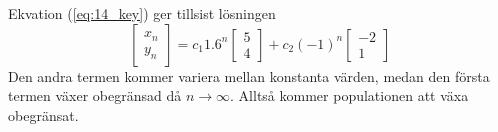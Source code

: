 \documentclass[a4paper]{article}
\begin{document}
Ekvation (\ref{eq:14_key}) ger tillsist lösningen
\begin{equation*}
\begin{bmatrix}x_n\\y_n\end{bmatrix} =c_1 1.6^n\begin{bmatrix}5\\4\end{bmatrix} + c_2(-1)^n\begin{bmatrix}-2\\1\end{bmatrix}
\end{equation*}
Den andra termen kommer variera mellan konstanta värden, medan den första termen växer obegränsad då $n\to\infty$. Alltså kommer populationen att växa obegränsat.
\end{document}
